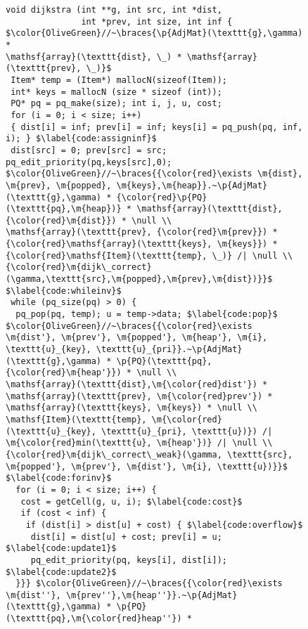 
\begin{figure}[t]

\begin{lstlisting}[mathescape=true,showlines=true]
void dijkstra (int **g, int src, int *dist, 
               int *prev, int size, int inf {
$\color{OliveGreen}//~\braces{\p{AdjMat}(\texttt{g},\gamma) *
\mathsf{array}(\texttt{dist}, \_) * \mathsf{array}(\texttt{prev}, \_)}$
 Item* temp = (Item*) mallocN(sizeof(Item));
 int* keys = mallocN (size * sizeof (int));
 PQ* pq = pq_make(size); int i, j, u, cost;
 for (i = 0; i < size; i++) 
 { dist[i] = inf; prev[i] = inf; keys[i] = pq_push(pq, inf, i); } $\label{code:assigninf}$
 dist[src] = 0; prev[src] = src; pq_edit_priority(pq,keys[src],0);
$\color{OliveGreen}//~\braces{{\color{red}\exists \m{dist}, \m{prev}, \m{popped}, \m{keys},\m{heap}}.~\p{AdjMat}(\texttt{g},\gamma) * {\color{red}\p{PQ}(\texttt{pq},\m{heap})} * \mathsf{array}(\texttt{dist},{\color{red}\m{dist}}) * \null \\
\mathsf{array}(\texttt{prev}, {\color{red}\m{prev}}) * 
{\color{red}\mathsf{array}(\texttt{keys}, \m{keys}}) * 
{\color{red}\mathsf{Item}(\texttt{temp}, \_)} /| \null \\
{\color{red}\m{dijk\_correct}(\gamma,\texttt{src},\m{popped},\m{prev},\m{dist})}}$ $\label{code:whileinv}$
 while (pq_size(pq) > 0) {
  pq_pop(pq, temp); u = temp->data; $\label{code:pop}$
$\color{OliveGreen}//~\braces{{\color{red}\exists \m{dist'}, \m{prev'}, \m{popped'}, \m{heap'}, \m{i}, \texttt{u}_{key}, \texttt{u}_{pri}}.~\p{AdjMat}(\texttt{g},\gamma) * \p{PQ}(\texttt{pq},{\color{red}\m{heap'}}) * \null \\
\mathsf{array}(\texttt{dist},\m{\color{red}dist'}) * 
\mathsf{array}(\texttt{prev}, \m{\color{red}prev'}) * 
\mathsf{array}(\texttt{keys}, \m{keys}) * \null \\
\mathsf{Item}(\texttt{temp}, \m{\color{red}(\texttt{u}_{key}, \texttt{u}_{pri}, \texttt{u})}) /| 
\m{\color{red}min(\texttt{u}, \m{heap'})} /| \null \\
{\color{red}\m{dijk\_correct\_weak}(\gamma, \texttt{src}, \m{popped'}, \m{prev'}, \m{dist'}, \m{i}, \texttt{u})}}$ $\label{code:forinv}$
  for (i = 0; i < size; i++) {
   cost = getCell(g, u, i); $\label{code:cost}$
   if (cost < inf) {
    if (dist[i] > dist[u] + cost) { $\label{code:overflow}$
     dist[i] = dist[u] + cost; prev[i] = u; $\label{code:update1}$ 
     pq_edit_priority(pq, keys[i], dist[i]); $\label{code:update2}$
  }}} $\color{OliveGreen}//~\braces{{\color{red}\exists \m{dist''}, \m{prev''},\m{heap''}}.~\p{AdjMat}(\texttt{g},\gamma) * \p{PQ}(\texttt{pq},\m{\color{red}heap''}) *

\end{lstlisting}
\end{figure}
